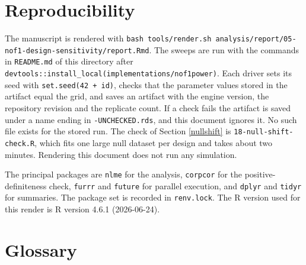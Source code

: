 \documentclass[
  11pt,
]{article}
\begin{document}
\section{Reproducibility}\label{reproducibility}

The manuscript is rendered with \texttt{bash\ tools/render.sh\ analysis/report/05-nof1-design-sensitivity/report.Rmd}. The sweeps are run with the commands in \texttt{README.md} of this directory after \texttt{devtools::install\_local(\textquotesingle{}implementations/nof1power\textquotesingle{})}. Each driver sets its seed with \texttt{set.seed(42\ +\ id)}, checks that the parameter values stored in the artifact equal the grid, and saves an artifact with the engine version, the repository revision and the replicate count. If a check fails the artifact is saved under a name ending in \texttt{-UNCHECKED.rds}, and this document ignores it. No such file exists for the stored run. The check of Section \ref{nullshift} is \texttt{18-null-shift-check.R}, which fits one large null dataset per design and takes about two minutes. Rendering this document does not run any simulation.

The principal packages are \texttt{nlme} for the analysis, \texttt{corpcor} for the positive-definiteness check, \texttt{furrr} and \texttt{future} for parallel execution, and \texttt{dplyr} and \texttt{tidyr} for summaries. The package set is recorded in \texttt{renv.lock}. The R version used for this render is R version 4.6.1 (2026-06-24).

\section{Glossary}\label{glossary}
\end{document}

